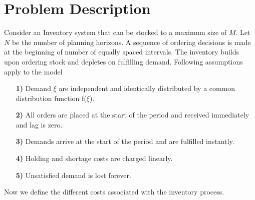 \documentclass[12pt,a4paper,oneside]{report}
\begin{document}
\chapter{Problem Description}
Consider an Inventory system that can be stocked to a maximum size of $M$. Let $N$ be the number of planning horizons. A sequence of ordering decisions is made at the beginning of number of equally spaced intervals. The inventory builds upon ordering stock and depletes on fulfilling demand. Following assumptions apply to the model 
\begin{enumerate}
\item[\textbf{1)}] Demand $\xi$ are independent and identically distributed by a common distribution function f($\xi$).
\item[\textbf{2)}] All orders are placed at the start of the period and received immediately and lag is zero.
\item[\textbf{3)}] Demands arrive at the start of the period and are fulfilled instantly.
\item[\textbf{4)}] Holding and shortage costs are charged linearly.
\item[\textbf{5)}] Unsatisfied demand is lost forever.
\end{enumerate}
\noindent Now we define the different costs associated with the inventory process.\\
\end{document}
